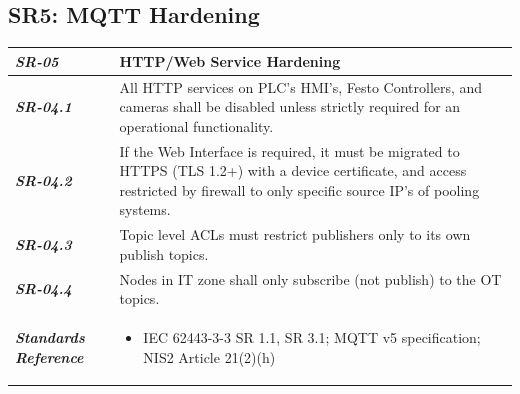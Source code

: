 \documentclass[11pt,a4paper]{article}
\begin{document}
\subsection{SR5: MQTT Hardening}\label{SR5}
\begin{tabularx}{\textwidth}{>{\bfseries}p{2.5cm} X}
    \textit{SR-05} & \textbf{HTTP/Web Service Hardening} \vspace{0.5em}\\
\toprule
\textit{SR-04.1} &

    All HTTP services on PLC's HMI's, Festo Controllers, and cameras shall be disabled unless strictly required for an operational functionality.
    \vspace{0.5em}
\\
\textit{SR-04.2} &
    If the Web Interface is required, it must be migrated to HTTPS (TLS 1.2+) with a device certificate, and access restricted by firewall to only specific source
    IP's of pooling systems.
    \vspace{0.5em}
    \\
\textit{SR-04.3} &
    Topic level ACLs must restrict publishers only to its own publish topics.
    \vspace{0.5em}
    \\
\textit{SR-04.4} &
    Nodes in IT zone shall only subscribe (not publish) to the OT topics.
    \vspace{0.5em}
    \\
\midrule
    \textit{Standards Reference} &
\begin{itemize}[label=-, noitemsep, topsep=0pt, leftmargin=*]
    \item IEC 62443-3-3 SR 1.1, SR 3.1; MQTT v5 specification; NIS2 Article 21(2)(h)
\end{itemize} \vspace{1em} \\ 
\end{tabularx}
\vspace{2em}

\end{document}
